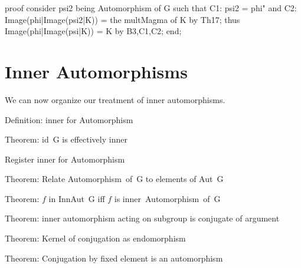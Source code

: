 \nwenddocs{}\endmoddef\nwstartdeflinemarkup{}\nwenddeflinemarkup
proof
  consider psi2 being Automorphism of G such that
  C1: psi2 = phi" and
  C2: Image(phi|Image(psi2|K)) = the multMagma of K
  by Th17;
  thus Image(phi|Image(psi|K)) = K by B3,C1,C2;
end;
\nwendcode{}\nwdocspar
\nwenddocs{}%
\section{Inner Automorphisms}\label{sec:characteristic:inner-automorphism}
We can now organize our treatment of inner automorphisms.

\nwenddocs{}\endmoddef\nwstartdeflinemarkup{}\nwenddeflinemarkup
\LA{}Definition: \code{}inner\edoc{} for Automorphism~{\nwtagstyle{}}\RA{}

\LA{}Theorem: \code{}id\ G\edoc{} is effectively inner~{\nwtagstyle{}}\RA{}

\LA{}Register \code{}inner\edoc{} for \code{}Automorphism\edoc{}~{\nwtagstyle{}}\RA{}

\LA{}Theorem: Relate \code{}Automorphism\ of\ G\edoc{} to elements of \code{}Aut\ G\edoc{}~{\nwtagstyle{}}\RA{}

\LA{}Theorem: $f$ in \code{}InnAut\ G\edoc{} iff $f$ is \code{}inner\ Automorphism\ of\ G\edoc{}~{\nwtagstyle{}}\RA{}

\LA{}Theorem: inner automorphism acting on subgroup is conjugate of argument~{\nwtagstyle{}}\RA{}

\LA{}Theorem: Kernel of conjugation as endomorphism~{\nwtagstyle{}}\RA{}

\LA{}Theorem: Conjugation by fixed element is an automorphism~{\nwtagstyle{}}\RA{}

